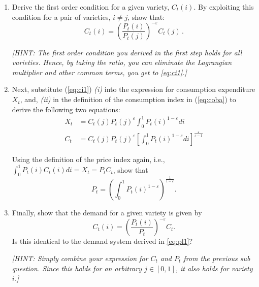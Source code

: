 \documentclass[a4paper,11pt]{article}
\begin{document}
\begin{enumerate}
\item[4.] Derive the first order condition for a given variety, $C_t(i)$. By exploiting this condition for a pair of varieties, $i\neq j$, show that:
\begin{equation}\label{eq:ci1}
C_{t}(i)=\left( \frac{P_{t}(i)}{P_{t}(j)}\right) ^{-\varepsilon }C_{t}(j)\,.  
\end{equation}

\textit{[HINT: The first order condition you derived in the first step holds for all varieties. Hence, by taking the ratio, you can eliminate the Lagrangian multiplier and other common terms, you get to \ref{eq:ci1}.]}

\item[5.] Next, substitute (\ref{eq:ci1}) \textit{(i)} into the expression for consumption expenditure $X_t$, and, \textit{(ii)} in the definition of the consumption index in (\ref{eq:coba}) to derive the following two equations: 
\begin{align*}
    X_t &= C_t(j)P_t(j)^{\varepsilon}\int_0^1P_t(i)^{1-\varepsilon}di \\
    C_t &= C_t(j)P_t(j)^{\varepsilon} \left[ \int_0^1P_t(i)^{1-\varepsilon}di \right]^{\frac{\varepsilon}{\varepsilon-1}}
\end{align*}

Using the definition of the price index again, i.e., $\int_0^1P_t(i)C_t(i)di =X_t= P_t C_t$, show that 
\begin{equation}
    P_{t} = \left( \int_0^1P_t(i)^{1-\varepsilon}  \right)^{\frac{1}{1-\varepsilon}}.
\end{equation}

\item[6.] Finally, show that the demand for a given variety is given by
\begin{equation}
C_{t}(i)=\left( \frac{P_{t}(i)}{P_t}\right) ^{-\varepsilon }C_t.  
\end{equation}
Is this identical to the demand system derived in \ref{eq:pl1}? 

\textit{[HINT: Simply combine your expression for $C_t$ and $P_t$ from the previous sub question. Since this holds for an arbitrary $j \in [0,1]$, it also holds for variety $i$.]}
\end{enumerate}





%
\end{document}
